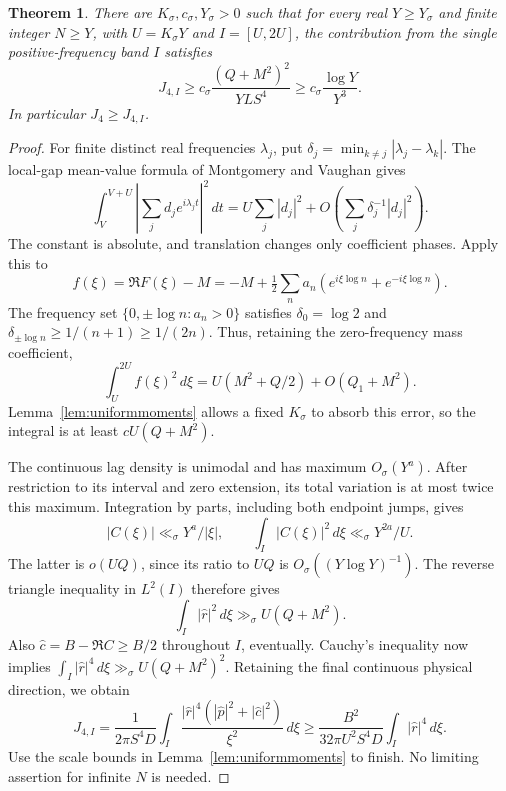 \documentclass[11pt,a4paper]{article}
\newtheorem{theorem}{Theorem}[section]
\theoremstyle{definition}
\theoremstyle{remark}
\newcommand{\dd}{\,d}
\begin{document}
\begin{theorem}\label{thm:mesoscopicfloor}
There are \(K_\sigma,c_\sigma,Y_\sigma>0\) such that for every real
\(Y\ge Y_\sigma\) and finite integer \(N\ge Y\), with
\(U=K_\sigma Y\) and \(I=[U,2U]\), the contribution from the single
positive-frequency band \(I\) satisfies
\begin{equation}
 J_{4,I}\ge
 c_\sigma\frac{(Q+M^2)^2}{YLS^4}
 \ge c_\sigma\frac{\log Y}{Y^3}.
 \label{eq:mesofloor}
\end{equation}
In particular \(J_4\ge J_{4,I}\).
\end{theorem}
\begin{proof}
For finite distinct real frequencies \(\lambda_j\), put
\(\delta_j=\min_{k\ne j}|\lambda_j-\lambda_k|\).
The local-gap mean-value formula of Montgomery and Vaughan
\cite[Corollary 2, (1.9)]{MV} gives
\[
 \int_V^{V+U}\left|\sum_j d_j e^{i\lambda_j t}\right|^2\dd t
 =U\sum_j|d_j|^2+
 O\left(\sum_j\delta_j^{-1}|d_j|^2\right).
\]
The constant is absolute, and translation changes only coefficient
phases. Apply this to
\[
 f(\xi)=\Re F(\xi)-M
 =-M+\tfrac12\sum_n a_n
       (e^{i\xi\log n}+e^{-i\xi\log n}).
\]
The frequency set \(\{0,\pm\log n:a_n>0\}\) satisfies
\(\delta_0=\log2\) and
\(\delta_{\pm\log n}\ge1/(n+1)\ge1/(2n)\).
Thus, retaining the zero-frequency mass coefficient,
\[
 \int_U^{2U} f(\xi)^2\dd\xi
 =U(M^2+Q/2)+O(Q_1+M^2).
\]
Lemma~\ref{lem:uniformmoments} allows a fixed \(K_\sigma\) to absorb
this error, so the integral is at least \(cU(Q+M^2)\).

The continuous lag density is unimodal and has maximum
\(O_\sigma(Y^a)\). After restriction to its interval and zero
extension, its total variation is at most twice this maximum.
Integration by parts, including both endpoint jumps, gives
\[
 |C(\xi)|\ll_\sigma Y^a/|\xi|,\qquad
 \int_I|C(\xi)|^2\dd\xi\ll_\sigma Y^{2a}/U.
\]
The latter is \(o(UQ)\), since its ratio to \(UQ\) is
\(O_\sigma((Y\log Y)^{-1})\). The reverse triangle inequality in
\(L^2(I)\) therefore gives
\[
 \int_I|\widehat r|^2\dd\xi\gg_\sigma U(Q+M^2).
\]
Also \(\widehat c=B-\Re C\ge B/2\) throughout \(I\), eventually.
Cauchy's inequality now implies
\(\int_I|\widehat r|^4\dd\xi\gg_\sigma U(Q+M^2)^2\).
Retaining the final continuous physical direction, we obtain
\[
 J_{4,I}
 =\frac1{2\pi S^4D}\int_I
   \frac{|\widehat r|^4(|\widehat p|^2+|\widehat c|^2)}{\xi^2}\dd\xi
 \ge\frac{B^2}{32\pi U^2S^4D}\int_I|\widehat r|^4\dd\xi .
\]
Use the scale bounds in Lemma~\ref{lem:uniformmoments} to finish.
No limiting assertion for infinite \(N\) is needed.
\end{proof}
\end{document}
